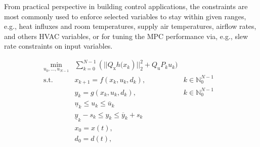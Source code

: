 \documentclass[10pt]{extarticle}
\begin{document}
From practical perspective in building control applications,
the constraints are most commonly used to enforce selected
variables to stay within given ranges, e.g., heat influxes
and room temperatures, supply air temperatures, airflow rates,
and others HVAC variables, or for tuning the MPC performance via,
e.g., slew rate constraints on input variables.


\begin{subequations}
	\label{eq:mpc_building_formal}
	\begin{align}
	\min_{u_0, \ldots, u_{N-1}}  
	&\sum_{k=0}^{N-1} (||{Q_{\text{x}} h(x_{k}})||_2^2
	+ {Q_{\text{u}} P_k u_{k}}) &
	\label{eq:mpc_building_formal:cost}\\
	\text{s.t.} \ & x_{k+1} = f(x_k, u_k, d_k),  & k \in \mathbb{N}_{0}^{N-1} & \label{eq:mpc_general_formal:xp} \\
	& y_{k} = g(x_k, u_k, d_k),  & k \in \mathbb{N}_{0}^{N-1} & \label{eq:mpc_general_formal:yp} \\
	& \underline{u}_k   \le u_{k} \le  \overline{u}_k    \label{eq:mpc_building_formal:ub}\\
	& \underline{y}_k  -s_k \le y_{k} \le  \overline{y}_k + s_k  
	\label{eq:mpc_building_formal:yb}\\
	& x_0 = x(t),\label{eq:mpc_general_formal:x0} \\
	& d_0 = d(t),\label{eq:mpc_general_formal:d0}
	\end{align}
\end{subequations}
\end{document}
